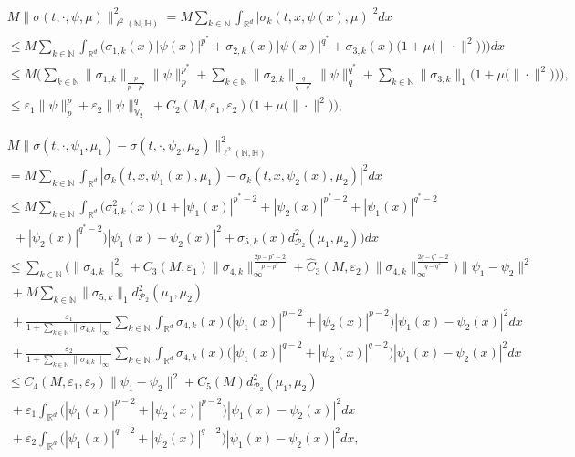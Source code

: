 \documentclass[10pt,a4paper]{amsart}
\renewcommand{\leq}{\leqslant}
\begin{document}
\begin{align}\label{h2-}
&M\|\sigma(t,\cdot,\psi,\mu)\|^2_{
\ell^2(\mathbb{N},
\mathbb{H})}
=M\sum_{k\in\mathbb{N}}\int_{\mathbb{R}^d}
|\sigma_k(t,x,\psi(x),\mu)|^2dx
\nonumber\\
&\leq
M\sum_{k\in\mathbb{N}}\int_{\mathbb{R}^d}
\Big(
\sigma_{1,k}(x)
|\psi(x)|^{p^*}+
\sigma_{2,k}(x)
|\psi(x)|^{q^*}
 +
\sigma_{3,k}(x)
\big(1+\mu\big(\|\cdot\|^2\big)\big)\Big)dx
\nonumber\\
&\leq
 M
 \Bigg(
 \sum_{k\in\mathbb{N}}\|\sigma_{1,k} \|
 _{\frac p{p-p^*}}
 \| \psi\|^{p^*}_{p}
 +
 \sum_{k\in\mathbb{N}}\|\sigma_{2,k}\|
 _{\frac q{q-q^*} }
  \| \psi\|^{q^*}_{q}
 +
 \sum_{k\in\mathbb{N}}\|\sigma_{3,k}\|
 _{1}\big(1+\mu\big(\|\cdot\|^2
\big)\big)\Bigg),
\nonumber\\
&\le
\varepsilon_1
\|\psi\|_p^{p}+\varepsilon_2
\|\psi\|_{\mathbb{V}_2}^{q}\
+C_2(M,\varepsilon_1,\varepsilon_2)
\big(1+\mu\big(\|\cdot\|^2
\big)\big),
\end{align}

\begin{align}\label{h2--}
&M\|\sigma(t,\cdot,\psi_1,\mu_1)-
\sigma(t,\cdot,\psi_2,\mu_2)
\|^2_{
\ell^2(\mathbb{N},
\mathbb{H})}
\nonumber\\
&=M\sum_{k\in\mathbb{N}}\int_{\mathbb{R}^d}
|\sigma_k(t,x,\psi_1(x),\mu_1)
-\sigma_k(t,x,\psi_2(x),\mu_2)|^2dx
\nonumber\\
&
\leq M\sum_{k\in\mathbb{N}}\int_{\mathbb{R}^d}
\Big(\sigma^2_{4,k}(x)\big(1+ |\psi_1(x)|^{p^*-2}+ |\psi_2(x)|^{p^*-2} +|\psi_1(x)|^{q^*-2}
\nonumber\\& \ \ +|\psi_2(x)|^{q^*-2}
\big)|\psi_1(x)-\psi_2(x)|^2 +\sigma_{5,k}(x)
d_{\mathcal{P}_2}^2(\mu_1,\mu_2)\Big)dx
\nonumber\\
&\leq
\sum_{k\in\mathbb{N}}
\Big(\|\sigma_{4,k}\|^2_{\infty}+
C_3(M,\varepsilon_1)
\|\sigma_{4,k}\|_{\infty}^{\frac{2p-p^*-2}{p-p^*}}
+\widehat{C}_3(M,\varepsilon_2)
\|\sigma_{4,k}\|_{\infty}^{\frac {2q-q^*-2}{q-q^*}}\Big)
\|\psi_1-\psi_2\|^2
\nonumber\\
&\  +M\sum_{k\in\mathbb{N}}
\|\sigma_{5,k}\|_{1}
d_{\mathcal{P}_2}^2(\mu_1,\mu_2)
\nonumber\\
&\  + \frac{\varepsilon_1}{1+ \sum_{k\in\mathbb{N}}
\|\sigma_{4,k}\|_{\infty}}\sum_{k\in\mathbb{N}}
\int_{\mathbb{R}^d}
\sigma_{4,k}(x)\big(|\psi_1(x)|^{p-2}+ |\psi_2(x)|^{p-2}\big)|\psi_1(x)-\psi_2(x)|^2dx
\nonumber\\
&\ + \frac{\varepsilon_2}{1+ \sum_{k\in\mathbb{N}}
\|\sigma_{4,k}\|_{\infty}}
\sum_{k\in\mathbb{N}}\int_{\mathbb{R}^d}
\sigma_{4,k}(x)\big(|\psi_1(x)|^{q-2}+ |\psi_2(x)|^{q-2}\big)|\psi_1(x)-\psi_2(x)|^2dx
\nonumber\\&\leq C_4(M,\varepsilon_1,\varepsilon_2)
\|\psi_1-\psi_2\|^2
 +C_5(M)
d_{\mathcal{P}_2}^2(\mu_1,\mu_2)
\nonumber\\
&\ +\varepsilon_1\int_{\mathbb{R}^d}
 \big(|\psi_1(x)|^{p-2} +|\psi_2(x)|^{p-2}
\big)|\psi_1(x)-\psi_2(x)|^2dx
\nonumber\\
&\  +\varepsilon_2\int_{\mathbb{R}^d}
 \big(|\psi_1(x)|^{q-2} +|\psi_2(x)|^{q-2}
\big)|\psi_1(x)-\psi_2(x)|^2dx,
\end{align}
\end{document}
